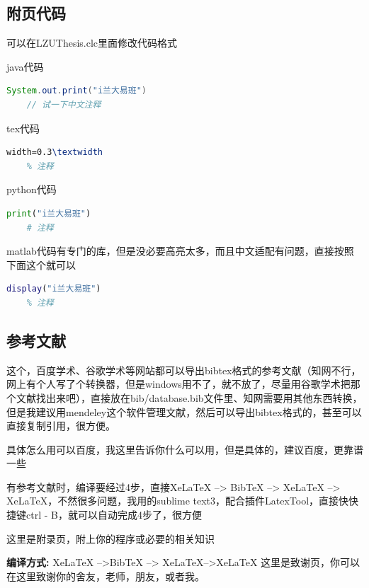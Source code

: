 \documentclass{LZUThesis}
\begin{document}


\subsection{附页代码} %
\label{sub:附页代码}
可以在LZUThesis.clc里面修改代码格式

java代码
\begin{lstlisting}[language = java]
    System.out.print("i兰大易班")
    // 试一下中文注释
\end{lstlisting}


tex代码
\begin{lstlisting}[language = tex]
    width=0.3\textwidth
    % 注释
\end{lstlisting}

python代码
\begin{lstlisting}[language = python]
    print("i兰大易班")
    # 注释
\end{lstlisting}

matlab代码有专门的库，但是没必要高亮太多，而且中文适配有问题，直接按照下面这个就可以
\begin{lstlisting}[language = matlab]
    display("i兰大易班")
    % 注释
\end{lstlisting}


\subsection{参考文献} %
\label{sub:参考文献}

这个，百度学术、谷歌学术等网站都可以导出bibtex格式的参考文献（知网不行，网上有个人写了个转换器，但是windows用不了，就不放了，尽量用谷歌学术把那个文献找出来吧），直接放在bib/database.bib文件里、知网需要用其他东西转换，但是我建议用mendeley这个软件管理文献，然后可以导出bibtex格式的，甚至可以直接复制引用，很方便\cite{partl2016}。

具体怎么用可以百度，我这里告诉你什么可以用，但是具体的，建议百度，更靠谱一些


有参考文献时，编译要经过4步，直接XeLaTeX --> BibTeX --> XeLaTeX --> XeLaTeX，不然很多问题，我用的sublime text3，配合插件LatexTool，直接快快捷键ctrl - B，就可以自动完成4步了，很方便










\backmatter


\printbib



\Appendix


这里是附录页，附上你的程序或必要的相关知识

{\bfseries 编译方式:} XeLaTeX -->BibTeX --> XeLaTeX-->XeLaTeX
\Thanks
这里是致谢页，你可以在这里致谢你的舍友，老师，朋友，或者我。
\end{document}
